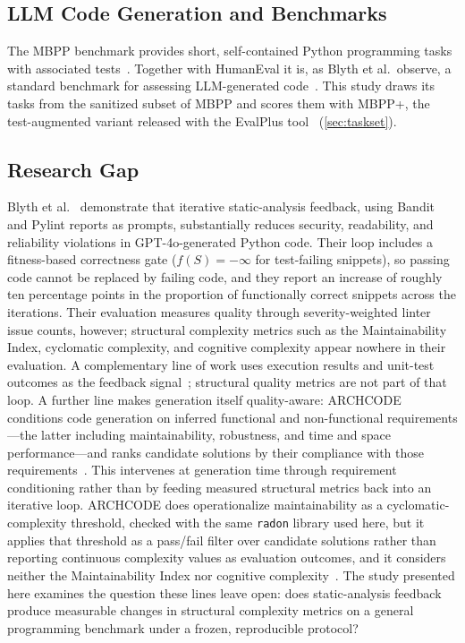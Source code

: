 \subsection{LLM Code Generation and Benchmarks}
The MBPP benchmark provides short, self-contained Python programming tasks with
associated tests~\citep{austin2021mbpp}. Together with HumanEval it is, as Blyth
et al.\ observe, a standard benchmark for assessing LLM-generated
code~\citep{blyth2025scam}. This study draws its tasks from the sanitized
subset of MBPP and scores them with MBPP+, the test-augmented variant released
with the EvalPlus tool~\citep{evalplus_tool} (\cref{sec:taskset}).

\subsection{Research Gap}
Blyth et al.~\citep{blyth2025scam} demonstrate that iterative static-analysis
feedback, using Bandit and Pylint reports as prompts, substantially reduces
security, readability, and reliability violations in GPT-4o-generated Python code.
Their loop includes a fitness-based correctness gate ($f(S)=-\infty$ for
test-failing snippets), so passing code cannot be replaced by failing code, and they
report an increase of roughly ten percentage points in the proportion of
functionally correct snippets across the iterations. Their
evaluation measures quality through severity-weighted linter issue counts,
however; structural complexity metrics such as the Maintainability Index,
cyclomatic complexity, and cognitive complexity appear nowhere in their evaluation. A
complementary line of work uses execution results and unit-test outcomes as the
feedback signal~\citep{chen2024selfdebug}; structural quality metrics are not part
of that loop. A further line makes
generation itself quality-aware: ARCHCODE conditions code generation on inferred
functional and non-functional requirements---the latter including maintainability,
robustness, and time and space performance---and ranks candidate solutions by their
compliance with those requirements~\citep{han2024archcode}. This intervenes at
generation time through requirement conditioning rather than by feeding measured
structural metrics back into an iterative loop. ARCHCODE does operationalize
maintainability as a cyclomatic-complexity threshold, checked with the same
\texttt{radon} library used here, but it applies that threshold as a pass/fail
filter over candidate solutions rather than reporting continuous complexity
values as evaluation outcomes, and it considers neither the Maintainability Index
nor cognitive complexity~\citep{han2024archcode}. The study presented
here examines the question these lines leave open: does static-analysis feedback
produce measurable changes in structural complexity metrics on a general
programming benchmark under a frozen, reproducible protocol?
